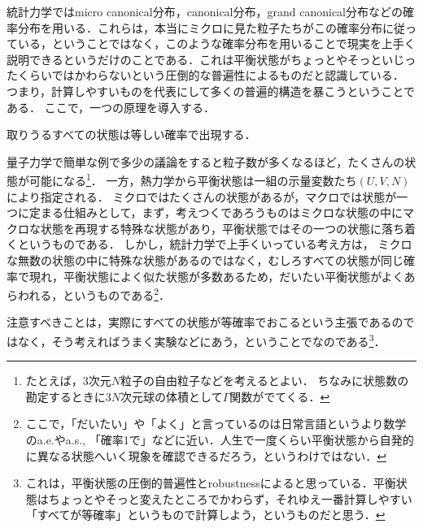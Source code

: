 	統計力学ではmicro canonical分布，canonical分布，grand canonical分布などの確率分布を用いる．これらは，本当にミクロに見た粒子たちがこの確率分布に従っている，ということではなく，このような確率分布を用いることで現実を上手く説明できるというだけのことである．これは平衡状態がちょっとやそっといじったくらいではかわらないという圧倒的な普遍性によるものだと認識している．
	つまり，計算しやすいものを代表にして多くの普遍的構造を暴こうということである．
	ここで，一つの原理を導入する．
	\begin{ppl}[等重率の原理]\label{ppl:equal}
			取りうるすべての状態は等しい確率で出現する．
	\end{ppl}
	量子力学で簡単な例で多少の議論をすると粒子数が多くなるほど，たくさんの状態が可能になる\footnote{たとえば，3次元$N$粒子の自由粒子などを考えるとよい．
	ちなみに状態数の勘定するときに$3N$次元球の体積として$\Gamma$関数がでてくる．}．
	一方，熱力学から平衡状態は一組の示量変数たち$(U, V, N)$により指定される．
	ミクロではたくさんの状態があるが，マクロでは状態が一つに定まる仕組みとして，まず，考えつくであろうものはミクロな状態の中にマクロな状態を再現する特殊な状態があり，平衡状態ではその一つの状態に落ち着くというものである．
	しかし，統計力学で上手くいっている考え方は，
	ミクロな無数の状態の中に特殊な状態があるのではなく，むしろすべての状態が同じ確率で現れ，平衡状態によく似た状態が多数あるため，だいたい平衡状態がよくあらわれる，というものである\footnote{ここで，「だいたい」や「よく」と言っているのは日常言語というより数学のa.e.やa.s., 「確率1で」などに近い．人生で一度くらい平衡状態から自発的に異なる状態へいく現象を確認できるだろう，というわけではない．}．

	注意すべきことは，実際にすべての状態が等確率でおこるという主張であるのではなく，そう考えればうまく実験などにあう，ということでなのである\footnote{これは，平衡状態の圧倒的普遍性とrobustnessによると思っている．平衡状態はちょっとやそっと変えたところでかわらず，それゆえ一番計算しやすい「すべてが等確率」というもので計算しよう，というものだと思う．}．

